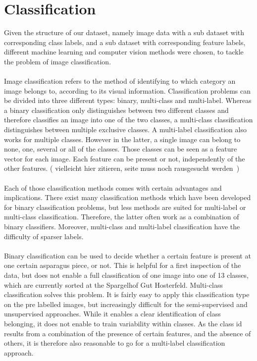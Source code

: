 %
\section{Classification}
\label{ch:Classification}

Given the structure of our dataset, namely image data with a sub dataset with corresponding class labels, and a sub dataset with corresponding feature labels, different machine learning and computer vision methods were chosen, to tackle the problem of image classification. \\
\\
Image classification refers to the method of identifying to which category an image belongs to, according to its visual information.  Classification problems can be divided into three different types: binary, multi-class and multi-label. Whereas a binary classification only distinguishes between two different classes and therefore classifies an image into one of the two classes, a multi-class classification distinguishes between multiple exclusive classes. A multi-label classification also works for multiple classes. However in the latter, a single image can belong to none, one, several or all of the classes. Those classes can be seen as a feature vector for each image. Each feature can be present or not, independently of the other features. ( vielleicht hier zitieren, seite muss noch rausgesucht werden~\citep{har2003constraint}) \\
\\
Each of those classification methods comes with certain advantages and implications.
There exist many classification methods which have been developed for binary classification problems, but less methods are suited for multi-label or multi-class classification. Therefore, the latter often work as a combination of binary classifiers. Moreover, multi-class and multi-label classification have the difficulty of sparser labels.  \\
\\
Binary classification can be used to decide whether a certain feature is present at one certain asparagus piece, or not. This is helpful for a first inspection of the data, but does not enable a full classification of one image into one of 13 classes, which are currently sorted at the Spargelhof Gut Hosterfeld. Multi-class classification solves this problem. It is fairly easy to apply this classification type on the pre labelled images, but increasingly difficult for the semi-supervised and unsupervised approaches. While it enables a clear identification of class belonging, it does not enable to train variability within classes. As the class id results from a combination of the presence of certain features, and the absence of others, it is therefore also reasonable to go for a multi-label classification approach.  \\
